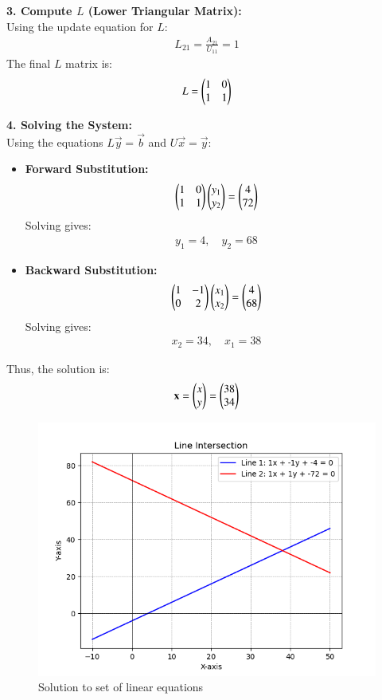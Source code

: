 \documentclass[journal]{IEEEtran}
\begin{document}
\textbf{3. Compute $L$ (Lower Triangular Matrix):}\\
Using the update equation for $L$:
\begin{align}
    L_{21} = \frac{A_{21}}{U_{11}} = 1
\end{align}
The final $L$ matrix is:
\begin{align}
    L = \begin{pmatrix}1 & 0 \\ 1 & 1\end{pmatrix}
\end{align}

\textbf{4. Solving the System:}\\
Using the equations $L\vec{y} = \vec{b}$ and $U\vec{x} = \vec{y}$:
\begin{itemize}
    \item \textbf{Forward Substitution:}
    \begin{align}
        \begin{pmatrix}1 & 0 \\ 1 & 1\end{pmatrix}\begin{pmatrix}y_1 \\ y_2\end{pmatrix} = \begin{pmatrix}4 \\ 72\end{pmatrix}
    \end{align}
    Solving gives:
    \begin{align}
        y_1 = 4, \quad y_2 = 68
    \end{align}

    \item \textbf{Backward Substitution:}
    \begin{align}
        \begin{pmatrix}1 & -1 \\ 0 & 2\end{pmatrix}\begin{pmatrix}x_1 \\ x_2\end{pmatrix} = \begin{pmatrix}4 \\ 68\end{pmatrix}
    \end{align}
    Solving gives:
    \begin{align}
        x_2 = 34, \quad x_1 = 38
    \end{align}
\end{itemize}

Thus, the solution is:
\begin{align}
    \mathbf{x} =\begin{pmatrix}x\\y\end{pmatrix}=\begin{pmatrix}38 \\ 34\end{pmatrix}
\end{align}

\begin{figure}[h!]
   \centering
   \includegraphics[width=0.7\columnwidth]{figs/fig.png}
    \caption{Solution to set of linear equations}
\end{figure}
\end{document}

